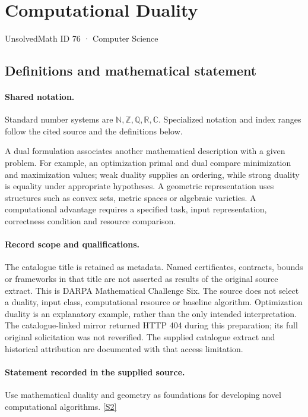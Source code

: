 \documentclass[11pt]{article}
\newcommand{\sref}[2]{\hyperlink{source:#1:#2}{[S#2]}}
\begin{document}
\setcounter{section}{75}
\section{Computational Duality}\label{76}
{\small\sffamily UnsolvedMath ID 76 · Computer Science}
\subsection{Definitions and mathematical statement}

\paragraph{Shared notation.}Standard number systems are $\mathbb N,\mathbb Z,\mathbb Q,\mathbb R,\mathbb C$. Specialized notation and index ranges follow the cited source and the definitions below.


A dual formulation associates another mathematical description with a given problem. For example, an optimization primal and dual compare minimization and maximization values; weak duality supplies an ordering, while strong duality is equality under appropriate hypotheses. A geometric representation uses structures such as convex sets, metric spaces or algebraic varieties. A computational advantage requires a specified task, input representation, correctness condition and resource comparison.
\paragraph{Record scope and qualifications.}
The catalogue title is retained as metadata. Named certificates, contracts, bounds or frameworks in that title are not asserted as results of the original source extract.
This is DARPA Mathematical Challenge Six. The source does not select a duality, input class, computational resource or baseline algorithm. Optimization duality is an explanatory example, rather than the only intended interpretation. The catalogue-linked mirror returned HTTP 404 during this preparation; its full original solicitation was not reverified. The supplied catalogue extract and historical attribution are documented with that access limitation.
\paragraph{Statement recorded in the supplied source.}
Use mathematical duality and geometry as foundations for developing novel computational algorithms. \sref{76}{2}
\end{document}
